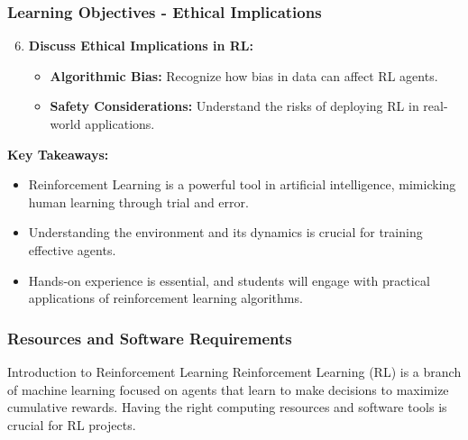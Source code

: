 \documentclass[aspectratio=169]{beamer}
\begin{document}
\begin{frame}[fragile]
    \frametitle{Learning Objectives - Ethical Implications}
    \begin{enumerate}
        \setcounter{enumi}{5} %
        \item \textbf{Discuss Ethical Implications in RL:}
        \begin{itemize}
            \item \textbf{Algorithmic Bias:} Recognize how bias in data can affect RL agents.
            \item \textbf{Safety Considerations:} Understand the risks of deploying RL in real-world applications.
        \end{itemize}
    \end{enumerate}
    
    \textbf{Key Takeaways:}
    \begin{itemize}
        \item Reinforcement Learning is a powerful tool in artificial intelligence, mimicking human learning through trial and error.
        \item Understanding the environment and its dynamics is crucial for training effective agents.
        \item Hands-on experience is essential, and students will engage with practical applications of reinforcement learning algorithms.
    \end{itemize}
\end{frame}

\begin{frame}
    \frametitle{Resources and Software Requirements}
    \begin{block}{Introduction to Reinforcement Learning}
        Reinforcement Learning (RL) is a branch of machine learning focused on agents that learn to make decisions to maximize cumulative rewards. Having the right computing resources and software tools is crucial for RL projects.
    \end{block}
\end{frame}
\end{document}

